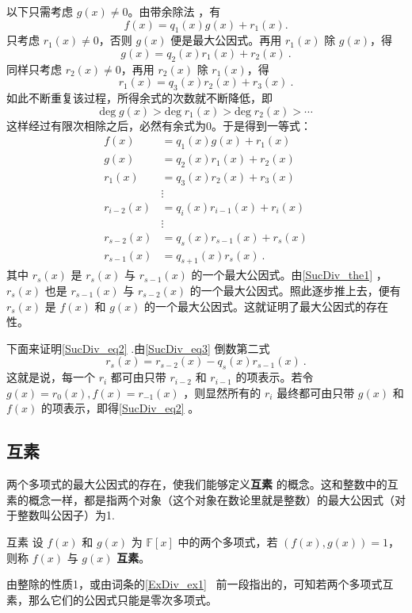 以下只需考虑 $g(x)\neq 0$。由带余除法 ，有
\begin{equation}
f(x)=q_1(x)g(x)+r_1(x).
\end{equation}
只考虑 $r_1(x)\neq 0$，否则 $g(x)$ 便是最大公因式。再用 $r_1(x)$ 除 $g(x)$，得
\begin{equation}
g(x)=q_2(x)r_1(x)+r_2(x)~.
\end{equation}
同样只考虑 $r_2(x)\neq0$，再用 $r_2(x)$ 除 $r_1(x)$，得
\begin{equation}
r_1(x)=q_3(x)r_2(x)+r_3(x)~.
\end{equation}
如此不断重复该过程，所得余式的次数就不断降低，即
\begin{equation}
\mathrm{deg}\;g(x)>\mathrm{deg}\;r_1(x)>\mathrm{deg}\;r_2(x)>\cdots
\end{equation}
这样经过有限次相除之后，必然有余式为0。于是得到一等式：
\begin{equation}\label{SucDiv_eq3}
\begin{aligned}
f(x)&=q_1(x)g(x)+r_1(x)\\
g(x)&=q_2(x)r_1(x)+r_2(x)\\
r_1(x)&=q_3(x)r_2(x)+r_3(x)\\
&\vdots\\
r_{i-2}(x)&=q_i(x)r_{i-1}(x)+r_i(x)\\
&\vdots\\
r_{s-2}(x)&=q_s(x)r_{s-1}(x)+r_s(x)\\
r_{s-1}(x)&=q_{s+1}(x)r_s(x)~.
\end{aligned}
\end{equation}
其中 $r_s(x)$ 是 $r_s(x)$ 与 $r_{s-1}(x)$ 的一个最大公因式。由\autoref{SucDiv_the1} ，$r_s(x)$ 也是 $r_{s-1}(x)$ 与 $r_{s-2}(x)$ 的一个最大公因式。照此逐步推上去，便有 $r_s(x)$ 是 $f(x)$ 和 $g(x)$ 的一个最大公因式。这就证明了最大公因式的存在性。

下面来证明\autoref{SucDiv_eq2} .由\autoref{SucDiv_eq3} 倒数第二式
\begin{equation}
r_s(x)=r_{s-2}(x)-q_s(x)r_{s-1}(x)~.
\end{equation}
这就是说，每一个 $r_i$ 都可由只带 $r_{i-2}$ 和 $r_{i-1}$ 的项表示。若令 $g(x)=r_0(x),f(x)=r_{-1}(x)$ ，则显然所有的 $r_i$ 最终都可由只带 $g(x)$ 和 $f(x)$ 的项表示，即得\autoref{SucDiv_eq2} 。
\subsection{互素}
两个多项式的最大公因式的存在，使我们能够定义\textbf{互素} 的概念。这和整数中的互素的概念一样，都是指两个对象（这个对象在数论里就是整数）的最大公因式（对于整数叫公因子）为1.
\begin{definition}{互素}
设 $f(x)$ 和 $g(x)$ 为 $\mathbb{F}[x]$ 中的两个多项式，若 $(f(x),g(x))=1$，则称 $f(x)$ 与 $g(x)$ \textbf{互素}。
\end{definition}
由整除的性质1，或由词条的\autoref{ExDiv_ex1}~ 前一段指出的，可知若两个多项式互素，那么它们的公因式只能是零次多项式。

